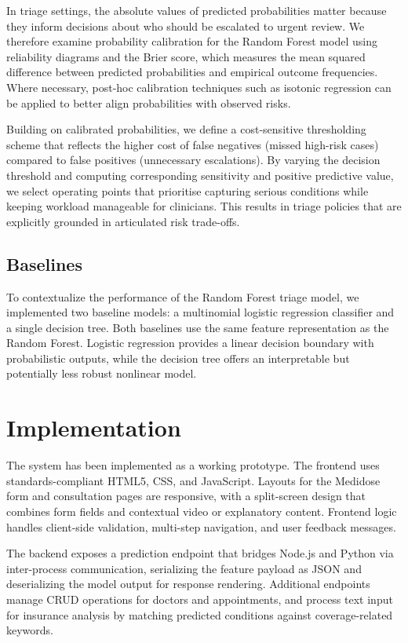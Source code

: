 \documentclass[conference]{IEEEtran}
\begin{document}
In triage settings, the absolute values of predicted probabilities matter because they inform decisions about who should be escalated to urgent review. We therefore examine probability calibration for the Random Forest model using reliability diagrams and the Brier score, which measures the mean squared difference between predicted probabilities and empirical outcome frequencies. Where necessary, post-hoc calibration techniques such as isotonic regression can be applied to better align probabilities with observed risks.

Building on calibrated probabilities, we define a cost-sensitive thresholding scheme that reflects the higher cost of false negatives (missed high-risk cases) compared to false positives (unnecessary escalations). By varying the decision threshold and computing corresponding sensitivity and positive predictive value, we select operating points that prioritise capturing serious conditions while keeping workload manageable for clinicians. This results in triage policies that are explicitly grounded in articulated risk trade-offs.

\subsection{Baselines}

To contextualize the performance of the Random Forest triage model, we implemented two baseline models: a multinomial logistic regression classifier and a single decision tree. Both baselines use the same feature representation as the Random Forest. Logistic regression provides a linear decision boundary with probabilistic outputs, while the decision tree offers an interpretable but potentially less robust nonlinear model.

\section{Implementation}

The system has been implemented as a working prototype. The frontend uses standards-compliant HTML5, CSS, and JavaScript. Layouts for the Medidose form and consultation pages are responsive, with a split-screen design that combines form fields and contextual video or explanatory content. Frontend logic handles client-side validation, multi-step navigation, and user feedback messages.

The backend exposes a prediction endpoint that bridges Node.js and Python via inter-process communication, serializing the feature payload as JSON and deserializing the model output for response rendering. Additional endpoints manage CRUD operations for doctors and appointments, and process text input for insurance analysis by matching predicted conditions against coverage-related keywords.
\end{document}
